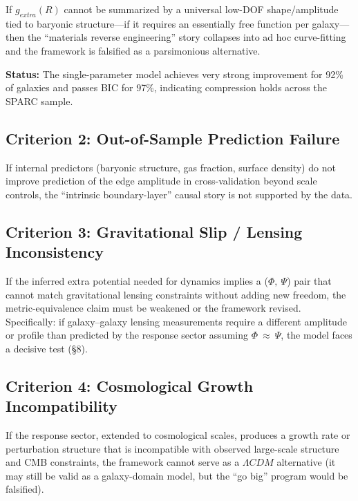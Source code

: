 \documentclass[11pt]{article}
\begin{document}
If \(g_{extra}(R)\) cannot be summarized by a universal low-DOF shape/amplitude tied to baryonic structure---if it requires an essentially free function per galaxy---then the ``materials reverse engineering'' story collapses into ad hoc curve-fitting and the framework is falsified as a parsimonious alternative.

\textbf{Status:} The single-parameter model achieves very strong improvement for 92\% of galaxies and passes BIC for 97\%, indicating compression holds across the SPARC sample.

\subsection{Criterion 2: Out-of-Sample Prediction Failure}\label{criterion-2-out-of-sample-prediction-failure}

If internal predictors (baryonic structure, gas fraction, surface density) do not improve prediction of the edge amplitude in cross-validation beyond scale controls, the ``intrinsic boundary-layer'' causal story is not supported by the data.

\subsection{Criterion 3: Gravitational Slip / Lensing Inconsistency}\label{criterion-3-gravitational-slip-lensing-inconsistency}

If the inferred extra potential needed for dynamics implies a (\(\Phi,\ \Psi\)) pair that cannot match gravitational lensing constraints without adding new freedom, the metric-equivalence claim must be weakened or the framework revised. Specifically: if galaxy--galaxy lensing measurements require a different amplitude or profile than predicted by the response sector assuming \(\Phi\  \approx \ \Psi\), the model faces a decisive test (§8).

\subsection{Criterion 4: Cosmological Growth Incompatibility}\label{criterion-4-cosmological-growth-incompatibility}

If the response sector, extended to cosmological scales, produces a growth rate or perturbation structure that is incompatible with observed large-scale structure and CMB constraints, the framework cannot serve as a \(\Lambda CDM\) alternative (it may still be valid as a galaxy-domain model, but the ``go big'' program would be falsified).
\end{document}
